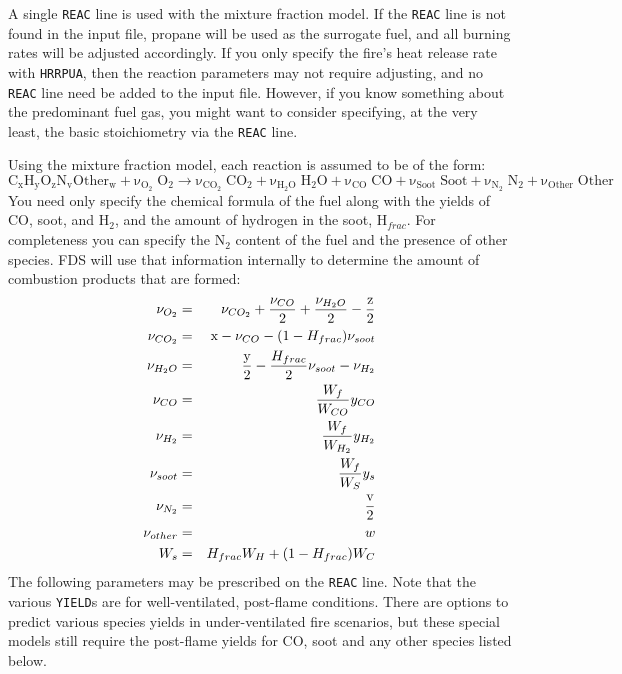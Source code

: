 \documentclass[11pt]{book}
\newcommand{\ct}{\tt\small}
\newcommand{\be}{\begin{equation}}
\newcommand{\ee}{\end{equation}}
\begin{document}
A single {\ct REAC} line is used with the mixture fraction model. If the {\ct REAC} line is not found in the input file, propane will
be used as the surrogate fuel, and all burning rates will be adjusted accordingly.
If you only specify the fire's heat release
rate with {\ct HRRPUA}, then the reaction parameters may not
require adjusting, and no {\ct REAC} line need be added to the input file.
However, if you know something about the predominant fuel gas, you might want to consider
specifying, at the very least, the basic stoichiometry via the {\ct REAC} line.

Using the mixture fraction model, each reaction is assumed to be of the form:
\be \mathrm{C_xH_yO_zN_vOther_w + \nu_{O_2} \; O_2 \rightarrow
    \nu_{CO_2} \; CO_2 + \nu_{H_2O} \; H_2O +
    \nu_{CO}   \; CO   + \nu_{Soot} \; Soot + \nu_{N_2} \; N_2 + \nu_{Other} \; Other } \ee
You need only specify the chemical formula of the fuel along with
the yields of CO, soot, and H$_2$, and the amount of hydrogen in the soot, H$_{frac}$.
For completeness you can specify the N$_2$ content of
the fuel and the presence of other species. FDS will use that information internally to
determine the amount of combustion products that are formed:
\begin{eqnarray*}
\nu_{O_2} &=& \nu_{CO_2} + \frac{\nu_{CO}}{2} + \frac{\nu_{H_2O}}{2} - \frac{\hbox{z}}{2} \\
\nu_{CO_2} &=& \hbox{x} - \nu_{CO} - (1-H_{frac}) \nu_{soot}  \\
\nu_{H_2O} &=& \frac{\hbox{y}}{2} - \frac{H_{frac}}{2} \nu_{soot} - \nu_{H_2} \\
\nu_{CO}   &=& \frac{W_f}{W_{CO}} y_{CO} \\
\nu_{H_2}  &=& \frac{W_f}{W_{H_2}} y_{H_2} \\
\nu_{soot} &=& \frac{W_f}{W_S} y_s \\
\nu_{N_2} &=& \frac{\hbox{v}}{2} \\
\nu_{other} &=& w\\
W_s &=& H_{frac} W_H + (1-H_{frac}) W_C
\end{eqnarray*}
The following parameters may be prescribed on the {\ct REAC} line.
Note that the various {\ct YIELD}s are for well-ventilated, post-flame conditions. There are options to
predict various species yields in under-ventilated fire scenarios, but these special models still require
the post-flame yields for CO, soot and any other species listed below.
\end{document}
